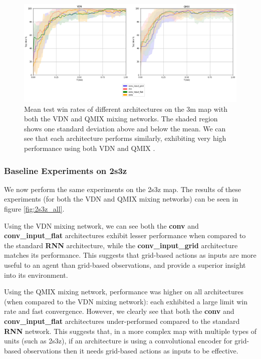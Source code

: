 \begin{figure}[h]
    \centering
    \hbox{\hspace{-6.35em}\includegraphics[width=1.34\textwidth]{images/graphs/all3m.png}}
    \caption{Mean test win rates of different architectures on the 3m map with both the VDN and QMIX mixing networks. The shaded region shows one standard deviation above and below the mean. We can see that each architecture performs similarly, exhibiting very high performance using both VDN and QMIX .}
    \label{fig:3m_all}
\end{figure}

\subsubsection{Baseline Experiments on 2s3z}
We now perform the same experiments on the 2s3z map. The results of these experiments (for both the VDN and QMIX mixing networks) can be seen in figure \ref{fig:2s3z_all}.

Using the VDN mixing network, we can see both the \textbf{conv} and \textbf{conv\_input\_flat} architectures exhibit lesser performance when compared to the standard \textbf{RNN} architecture, while the \textbf{conv\_input\_grid} architecture matches its performance. This suggests that grid-based actions as inputs are more useful to an agent than grid-based observations, and provide a superior insight into its environment.


Using the QMIX mixing network, performance was higher on all architectures (when compared to the VDN mixing network): each exhibited a large limit win rate and fast convergence. However, we clearly see that both the \textbf{conv} and \textbf{conv\_input\_flat} architectures under-performed compared to the standard \textbf{RNN} network. This suggests that, in a more complex map with multiple types of units (such as 2s3z), if an architecture is using a convolutional encoder for grid-based observations then it needs grid-based actions as inputs to be effective. 

